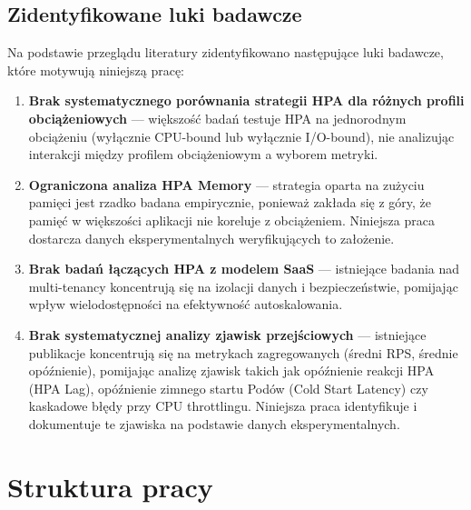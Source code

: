 \subsection{Zidentyfikowane luki badawcze}

Na podstawie przeglądu literatury zidentyfikowano następujące luki badawcze, które motywują niniejszą pracę:

\begin{enumerate}
  \item \textbf{Brak systematycznego porównania strategii HPA dla różnych profili obciążeniowych} --- większość badań testuje HPA na jednorodnym obciążeniu (wyłącznie CPU-bound lub wyłącznie I/O-bound), nie analizując interakcji między profilem obciążeniowym a wyborem metryki.

  \item \textbf{Ograniczona analiza HPA Memory} --- strategia oparta na zużyciu pamięci jest rzadko badana empirycznie, ponieważ zakłada się z góry, że pamięć w większości aplikacji nie koreluje z obciążeniem. Niniejsza praca dostarcza danych eksperymentalnych weryfikujących to założenie.

  \item \textbf{Brak badań łączących HPA z modelem SaaS} --- istniejące badania nad multi-tenancy koncentrują się na izolacji danych i bezpieczeństwie, pomijając wpływ wielodostępności na efektywność autoskalowania.

  \item \textbf{Brak systematycznej analizy zjawisk przejściowych} --- istniejące publikacje koncentrują się na metrykach zagregowanych (średni RPS, średnie opóźnienie), pomijając analizę zjawisk takich jak opóźnienie reakcji HPA (HPA Lag), opóźnienie zimnego startu Podów (Cold Start Latency) czy kaskadowe błędy przy CPU throttlingu. Niniejsza praca identyfikuje i dokumentuje te zjawiska na podstawie danych eksperymentalnych.
\end{enumerate}

\section{Struktura pracy}

